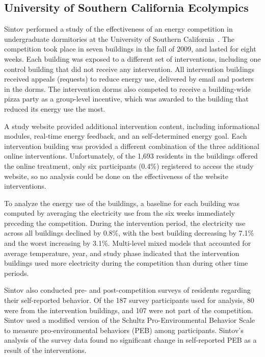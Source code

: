 \subsection{University of Southern California Ecolympics}

Sintov performed a study of the effectiveness of an energy competition in undergraduate dormitories at the University of Southern California~\cite{Sintov2011}. The competition took place in seven buildings in the fall of 2009, and lasted for eight weeks. Each building was exposed to a different set of interventions, including one control building that did not receive any intervention. All intervention buildings received appeals (requests) to reduce energy use, delivered by email and posters in the dorms. The intervention dorms also competed to receive a building-wide pizza party as a group-level incentive, which was awarded to the building that reduced its energy use the most.

A study website provided additional intervention content, including informational modules, real-time energy feedback, and an self-determined energy goal. Each intervention building was provided a different combination of the three additional online interventions. Unfortunately, of the 1,693 residents in the buildings offered the online treatment, only six participants (0.4\%) registered to access the study website, so no analysis could be done on the effectiveness of the website interventions.

To analyze the energy use of the buildings, a baseline for each building was computed by averaging the electricity use from the six weeks immediately preceding the competition. During the intervention period, the electricity use across all buildings declined by 0.8\%, with the best building decreasing by 7.1\% and the worst increasing by 3.1\%. Multi-level mixed models that accounted for average temperature, year, and study phase indicated that the intervention buildings used more electricity during the competition than during other time periods.

Sintov also conducted pre- and post-competition surveys of residents regarding their self-reported behavior. Of the 187 survey participants used for analysis, 80 were from the intervention buildings, and 107 were not part of the competition. Sintov used a modified version of the Schultz Pro-Environmental Behavior Scale to measure pro-environmental behaviors (PEB) among participants. Sintov's analysis of the survey data found no significant change in self-reported PEB as a result of the interventions.

